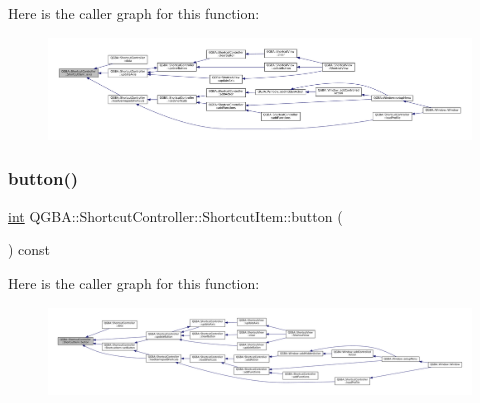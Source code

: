 Here is the caller graph for this function\+:
\nopagebreak
\begin{figure}[H]
\begin{center}
\leavevmode
\includegraphics[width=350pt]{class_q_g_b_a_1_1_shortcut_controller_1_1_shortcut_item_ae2f1e9c1375d9fe588abb53e3d7f480f_icgraph}
\end{center}
\end{figure}
\mbox{\label{class_q_g_b_a_1_1_shortcut_controller_1_1_shortcut_item_a5a4b00a5a06db6282dabe173b78b8a39}} 
\subsubsection{\texorpdfstring{button()}{button()}}
{\footnotesize\ttfamily \mbox{\hyperlink{ioapi_8h_a787fa3cf048117ba7123753c1e74fcd6}{int}} Q\+G\+B\+A\+::\+Shortcut\+Controller\+::\+Shortcut\+Item\+::button (\begin{DoxyParamCaption}{ }\end{DoxyParamCaption}) const\hspace{0.3cm}{\ttfamily [inline]}}

Here is the caller graph for this function\+:
\nopagebreak
\begin{figure}[H]
\begin{center}
\leavevmode
\includegraphics[width=350pt]{class_q_g_b_a_1_1_shortcut_controller_1_1_shortcut_item_a5a4b00a5a06db6282dabe173b78b8a39_icgraph}
\end{center}
\end{figure}
\mbox{\label{class_q_g_b_a_1_1_shortcut_controller_1_1_shortcut_item_a4f59fb8b2d637d66a49cc58dc8b6007f}} 
